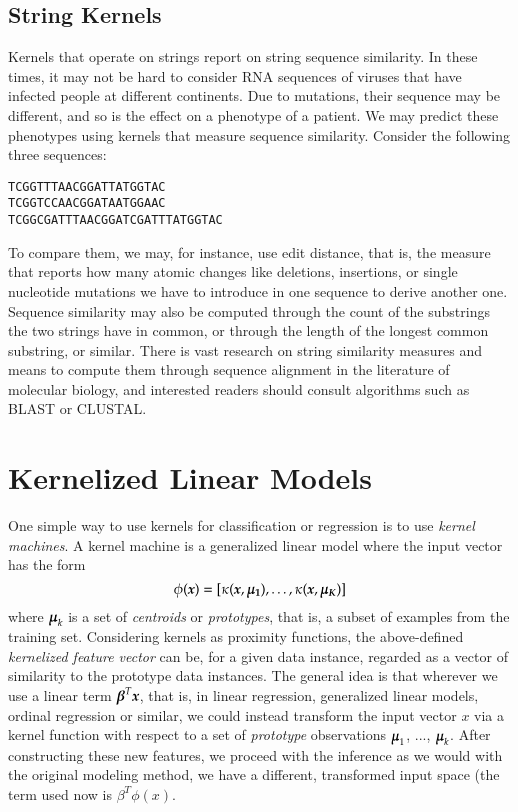 \begin{refsection}
\subsection*{String Kernels}

Kernels that operate on strings report on string sequence similarity. In these times, it may not be hard to consider RNA sequences of viruses that have infected people at different continents. Due to mutations, their sequence may be different, and so is the effect on a phenotype of a patient. We may predict these phenotypes using kernels that measure sequence similarity. Consider the following three sequences:
\begin{verbatim}
TCGGTTTAACGGATTATGGTAC
TCGGTCCAACGGATAATGGAAC
TCGGCGATTTAACGGATCGATTTATGGTAC
\end{verbatim}
To compare them, we may, for instance, use edit distance, that is, the measure that reports how many atomic changes like deletions, insertions, or single nucleotide mutations we have to introduce in one sequence to derive another one. Sequence similarity may also be computed through the count of the substrings the two strings have in common, or through the length of the longest common substring, or similar. There is vast research on string similarity measures and means to compute them through sequence alignment in the literature of molecular biology, and interested readers should consult algorithms such as BLAST or CLUSTAL.

\section{Kernelized Linear Models}

One simple way to use kernels for classification or regression is to use {\em kernel machines}. A kernel machine is a generalized linear model where the input vector has the form
$$ \phi(\boldsymbol{x})=[\kappa(\boldsymbol{x},\boldsymbol{\mu_1}), \ldots, \kappa(\boldsymbol{x},\boldsymbol{\mu_K}) ] $$
where $\boldsymbol{\mu}_k$ is a set of {\em centroids} or {\em prototypes}, that is, a subset of examples from the training set. Considering kernels as proximity functions, the above-defined {\em kernelized feature vector} can be, for a given data instance, regarded as a vector of similarity to the prototype data instances. The general idea is that wherever we use a linear term $\boldsymbol{\beta}^T\boldsymbol{x}$, that is, in linear regression, generalized linear models, ordinal regression or similar, we could instead transform the input vector $x$ via a kernel function with respect to a set of \emph{prototype} observations $\boldsymbol{\mu}_1$, ..., $\boldsymbol{\mu}_k$. After constructing these new features, we proceed with the inference as we would with the original modeling method, we have a different, transformed input space (the term used now is $\beta^T\phi(x)$.


\end{refsection}
